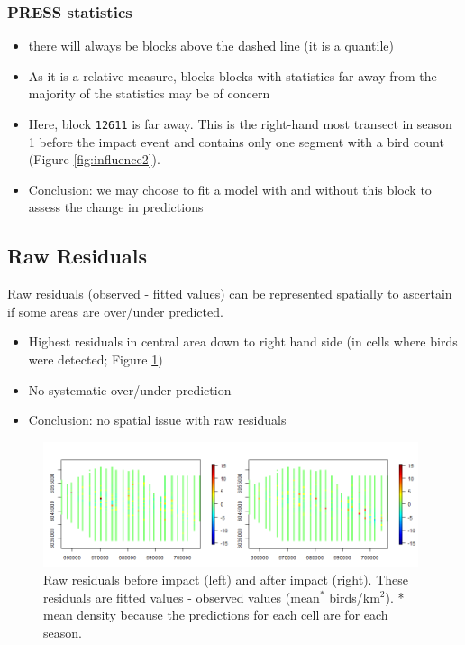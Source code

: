 \begin{frame}
\frametitle{PRESS statistics}
\begin{itemize}
  \item there will always be blocks above the dashed line (it is a quantile)
  \item As it is a relative measure, blocks  blocks with statistics far away from the majority of the statistics may be of concern
  \item Here, block {\tt 12611} is far away.  This is the right-hand most transect in season 1 before the impact event and contains only one segment with a bird count (Figure \ref{fig:influence2}).
  \pause
  \bigskip
  \item Conclusion: we may choose to fit a model with and without this block to assess the change in predictions
\end{itemize}
\end{frame}

\subsection{Raw Residuals}
\begin{frame}[fragile]
Raw residuals (observed - fitted values) can be represented spatially to ascertain if some areas are over/under predicted.  

\begin{itemize}
\item Highest residuals in central area down to right hand side (in cells where birds were detected; Figure \ref{fig:rawresid}) 
\item No systematic over/under prediction
\bigskip
\item Conclusion: no spatial issue with raw residuals
\end{itemize}
\end{frame}


\begin{frame}[fragile]
\begin{figure}[h]
  \centering
  \includegraphics[width=11cm]{danish/residualPlot.png}
  \caption{Raw residuals before impact (left) and after impact (right). These residuals are fitted values - observed values (mean$^*$ birds/km$^2$). * mean density because the predictions for each cell are for each season.}
  \label{fig:rawresid}
\end{figure}
\end{frame}

